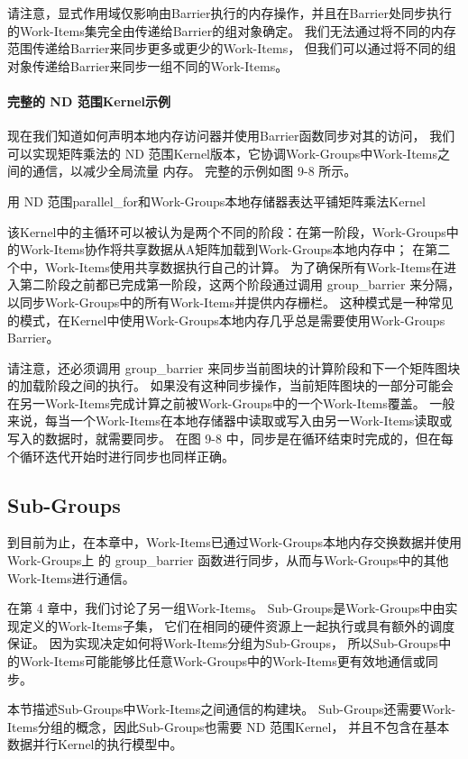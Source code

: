请注意，显式作用域仅影响由Barrier执行的内存操作，并且在Barrier处同步执行的Work-Items集完全由传递给Barrier的组对象确定。 
我们无法通过将不同的内存范围传递给Barrier来同步更多或更少的Work-Items，
但我们可以通过将不同的组对象传递给Barrier来同步一组不同的Work-Items。

\paragraph{完整的 ND 范围Kernel示例}

现在我们知道如何声明本地内存访问器并使用Barrier函数同步对其的访问，
我们可以实现矩阵乘法的 ND 范围Kernel版本，它协调Work-Groups中Work-Items之间的通信，以减少全局流量 内存。 
完整的示例如图 9-8 所示。

{\color{red} 用 ND 范围parallel\_for和Work-Groups本地存储器表达平铺矩阵乘法Kernel}

该Kernel中的主循环可以被认为是两个不同的阶段：在第一阶段，Work-Groups中的Work-Items协作将共享数据从A矩阵加载到Work-Groups本地内存中； 
在第二个中，Work-Items使用共享数据执行自己的计算。 
为了确保所有Work-Items在进入第二阶段之前都已完成第一阶段，这两个阶段通过调用 group\_barrier 来分隔，
以同步Work-Groups中的所有Work-Items并提供内存栅栏。 
这种模式是一种常见的模式，在Kernel中使用Work-Groups本地内存几乎总是需要使用Work-Groups Barrier。

请注意，还必须调用 group\_barrier 来同步当前图块的计算阶段和下一个矩阵图块的加载阶段之间的执行。 
如果没有这种同步操作，当前矩阵图块的一部分可能会在另一Work-Items完成计算之前被Work-Groups中的一个Work-Items覆盖。 
一般来说，每当一个Work-Items在本地存储器中读取或写入由另一Work-Items读取或写入的数据时，就需要同步。 
在图 9-8 中，同步是在循环结束时完成的，但在每个循环迭代开始时进行同步也同样正确。

\subsection{Sub-Groups}
到目前为止，在本章中，Work-Items已通过Work-Groups本地内存交换数据并使用Work-Groups上
的 group\_barrier 函数进行同步，从而与Work-Groups中的其他Work-Items进行通信。

在第 4 章中，我们讨论了另一组Work-Items。 Sub-Groups是Work-Groups中由实现定义的Work-Items子集，
它们在相同的硬件资源上一起执行或具有额外的调度保证。 
因为实现决定如何将Work-Items分组为Sub-Groups，
所以Sub-Groups中的Work-Items可能能够比任意Work-Groups中的Work-Items更有效地通信或同步。

本节描述Sub-Groups中Work-Items之间通信的构建块。 
Sub-Groups还需要Work-Items分组的概念，因此Sub-Groups也需要 ND 范围Kernel，
并且不包含在基本数据并行Kernel的执行模型中。

